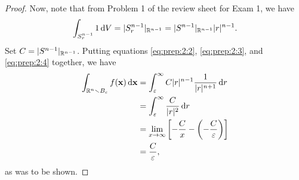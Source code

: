 \begin{proof}
Now, note that from Problem 1 of the review sheet for Exam 1, we have
\begin{equation}
  \label{eq:prep:2:4}
\int_{S_r^{n-1}}1\mathop{}\!\mathrm{d} V=|S_r^{n-1}|_{\mathbb{R}^{n-1}}=|S^{n-1}|_{\mathbb{R}^{n-1}}|r|^{n-1}.
\end{equation}
Set $C=|S^{n-1}|_{\mathbb{R}^{n-1}}$. Putting equations
\eqref{eq:prep:2:2}, \eqref{eq:prep:2:3}, and \eqref{eq:prep:2:4} together,
we have
\begin{equation}
\label{eq:prep:2:5}
\begin{aligned}
\int_{\mathbb{R}^n\smallsetminus B_\varepsilon}f(\mathbf{x})\mathop{}\!\mathrm{d}\mathbf{x}
&=\int_\varepsilon^\infty C|r|^{n-1}\frac{1}{|r|^{n+1}}\mathop{}\!\mathrm{d} r\\
&=\int_\varepsilon^\infty\frac{C}{|r|^2}\mathop{}\!\mathrm{d} r\\
&=\lim_{x\to\infty}\left[-\frac{C}{x}-\left(-\frac{C}{\varepsilon}\right)\right]\\
&=\frac{C}{\varepsilon},
\end{aligned}
\end{equation}
as was to be shown.
\end{proof}

